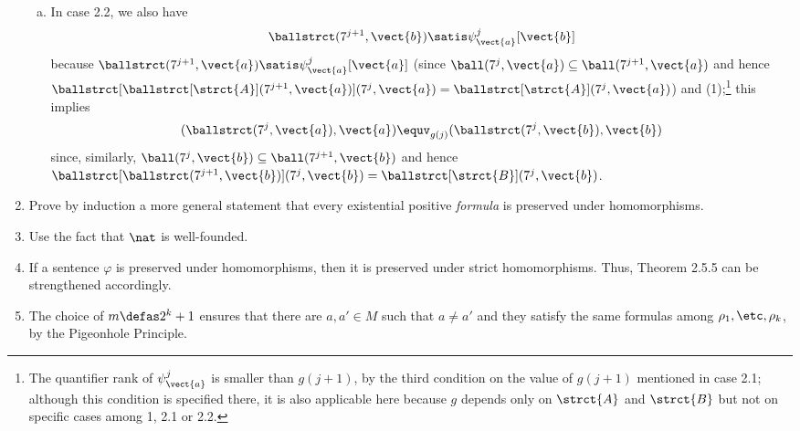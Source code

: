 \begin{enumerate}[1.]
\begin{enumerate}[(a)]
\item In case 2.2, we also have
\[
\ballstrct(7^{j + 1}, \vect{b}) \satis \psi^j_{\vect{a}}[\vect{b}]
\]
because $\ballstrct(7^{j + 1}, \vect{a}) \satis \psi^j_{\vect{a}}[\vect{a}]$ (since $\ball(7^j, \vect{a}) \subseteq \ball(7^{j + 1}, \vect{a})$ and hence $\ballstrct[{\ballstrct[\strct{A}](7^{j + 1}, \vect{a})}](7^j, \vect{a}) = \ballstrct[\strct{A}](7^j, \vect{a})$) and (1);\footnote{The quantifier rank of $\psi^j_{\vect{a}}$ is smaller than $g(j + 1)$, by the third condition on the value of $g(j + 1)$ mentioned in case 2.1; although this condition is specified there, it is also applicable here because $g$ depends only on $\strct{A}$ and $\strct{B}$ but not on specific cases among 1, 2.1 or 2.2.} this implies
\[
(\ballstrct(7^j, \vect{a}), \vect{a}) \equv_{g(j)} (\ballstrct(7^j, \vect{b}), \vect{b})
\]
since, similarly, $\ball(7^j, \vect{b}) \subseteq \ball(7^{j + 1}, \vect{b})$ and hence $\ballstrct[\ballstrct(7^{j + 1}, \vect{b})](7^j, \vect{b}) = \ballstrct[\strct{B}](7^j, \vect{b})$.
\end{enumerate}
%
\item {} Prove by induction a more general statement that every existential positive \emph{formula} is preserved under homomorphisms.
%
\item {} Use the fact that $\nat$ is well-founded.
%
\item {} If a sentence $\varphi$ is preserved under homomorphisms, then it is preserved under strict homomorphisms. Thus, Theorem 2.5.5 can be strengthened accordingly.
%
\item {} The choice of $m \defas 2^k + 1$ ensures that there are $a, a' \in M$ such that $a \neq a'$ and they satisfy the same formulas among $\rho_1, \etc, \rho_k$, by the Pigeonhole Principle.
%
\end{enumerate}
